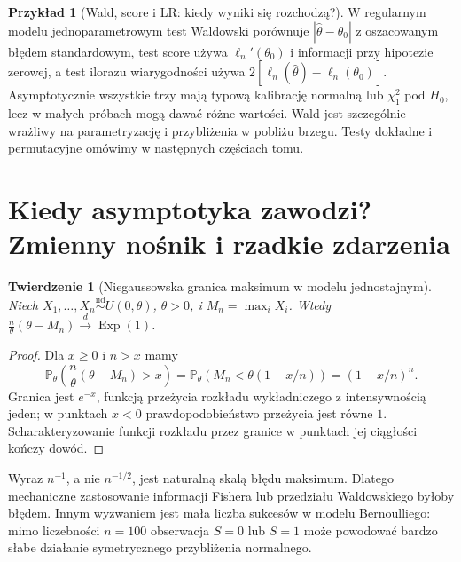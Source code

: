 \documentclass[11pt,a4paper,oneside]{report}
\numberwithin{equation}{chapter}
\theoremstyle{plain}
\newtheorem{twierdzenie}{Twierdzenie}[chapter]
\theoremstyle{definition}
\newtheorem{przyklad}{Przykład}[chapter]
\theoremstyle{remark}
\newcommand{\Prob}{\mathbb P}
\newcommand{\iid}{\mathrel{\overset{\mathrm{iid}}\sim}}
\begin{document}
\begin{przyklad}[Wald, score i LR: kiedy wyniki się rozchodzą?]
W regularnym modelu jednoparametrowym test Waldowski porównuje
$|\widehat\theta-\theta_0|$ z oszacowanym błędem standardowym,
test score używa $\ell_n'(\theta_0)$ i informacji przy hipotezie
zerowej, a test ilorazu wiarygodności używa
$2[\ell_n(\widehat\theta)-\ell_n(\theta_0)]$.
Asymptotycznie wszystkie trzy mają typową kalibrację normalną lub
$\chi^2_1$ pod $H_0$, lecz w małych próbach mogą dawać różne
wartości. Wald jest szczególnie wrażliwy na parametryzację i
przybliżenia w pobliżu brzegu. Testy dokładne i permutacyjne
omówimy w następnych częściach tomu.
\end{przyklad}

\section{Kiedy asymptotyka zawodzi? Zmienny nośnik i rzadkie zdarzenia}
\begin{twierdzenie}[Niegaussowska granica maksimum w modelu jednostajnym]
Niech $X_1,\ldots,X_n\iid U(0,\theta)$, $\theta>0$, i
$M_n=\max_iX_i$. Wtedy
$\frac n\theta(\theta-M_n)\xrightarrow{d}\operatorname{Exp}(1)$.
\end{twierdzenie}
\begin{proof}
Dla $x\ge0$ i $n>x$ mamy
\[
\Prob_\theta\left(\frac n\theta(\theta-M_n)>x\right)
=\Prob_\theta(M_n<\theta(1-x/n))=(1-x/n)^n.
\]
Granica jest $e^{-x}$, funkcją przeżycia rozkładu
wykładniczego z intensywnością jeden; w punktach $x<0$
prawdopodobieństwo przeżycia jest równe $1$.
Scharakteryzowanie funkcji rozkładu przez granice
w punktach jej ciągłości kończy dowód.
\end{proof}

Wyraz $n^{-1}$, a nie $n^{-1/2}$, jest naturalną skalą błędu
maksimum. Dlatego mechaniczne zastosowanie informacji Fishera
lub przedziału Waldowskiego byłoby błędem. Innym wyzwaniem jest
mała liczba sukcesów w modelu Bernoulliego: mimo liczebności
$n=100$ obserwacja $S=0$ lub $S=1$ może powodować bardzo słabe
działanie symetrycznego przybliżenia normalnego.
\end{document}
